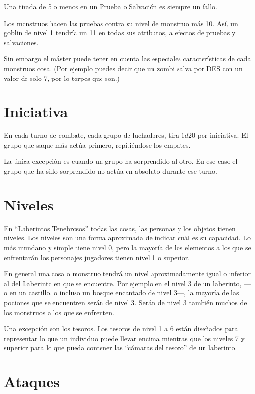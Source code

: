\begin{multicols}{2}

Una tirada de 5 o menos en un Prueba o Salvación es siempre un fallo.


Los monstruos hacen las pruebas contra su nivel de monstruo más 10. Así, un
goblin de nivel 1 tendría un 11 en todas sus atributos, a efectos de pruebas y
salvaciones.

Sin embargo el máster puede tener en cuenta las especiales características de
cada monstruos cosa. (Por ejemplo puedes decir que un zombi salva por DES con un
valor de solo 7, por lo torpes que son.)

\section{Iniciativa}

En cada turno de combate, cada grupo de luchadores, tira $ 1d20$ por iniciativa. El
grupo que saque más actúa primero, repitiéndose los empates.

La única excepción es cuando un grupo ha sorprendido al otro. En ese caso el grupo
que ha sido sorprendido no actúa en absoluto durante ese turno.

\section{Niveles}

En \enquote{Laberintos Tenebrosos} todas las cosas, las personas y los objetos
tienen niveles. Los niveles son una forma aproximada de indicar cuál es su capacidad.
Lo más mundano y simple tiene nivel 0, pero la mayoría de los
elementos a los que se enfrentarán los personajes jugadores tienen nivel 1 o superior.

En general una cosa o monstruo tendrá un nivel aproximadamente igual o inferior
al del Laberinto en que se encuentre. Por ejemplo en el nivel 3 de un laberinto,
---o en un castillo, o incluso un bosque encantado de nivel 3---, la mayoría de
las pociones que se encuentren serán de nivel 3. Serán de nivel 3 también muchos
de los monstruos a los que se enfrenten.

Una excepción son los tesoros. Los tesoros de nivel 1 a 6 están diseñados para
representar lo que un individuo puede llevar encima mientras que los niveles 7 y
superior para lo que pueda contener las \enquote{cámaras del tesoro} de un laberinto.

\section{Ataques}


\end{multicols}
